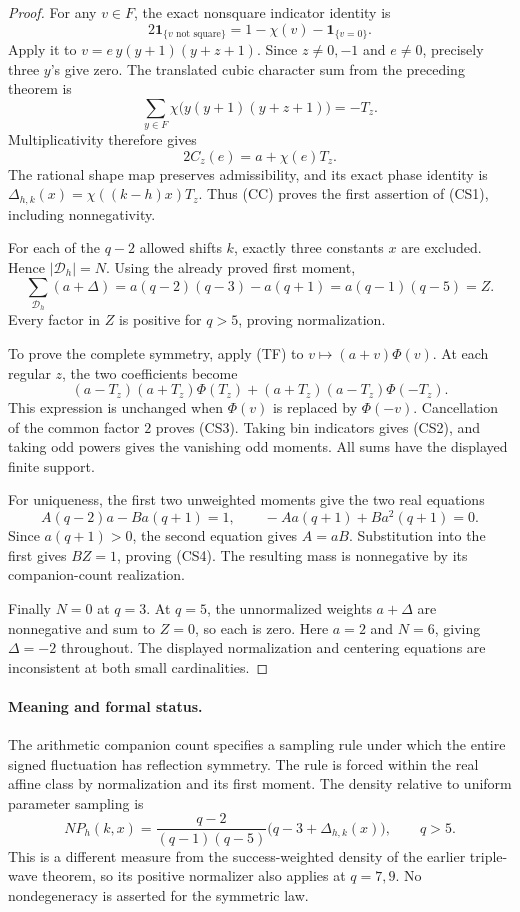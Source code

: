\documentclass[11pt]{article}
\begin{document}
\begin{proof}
For any \(v\in F\), the exact nonsquare indicator identity is
\[
 2\mathbf1_{\{v\text{ not square}\}}
 =1-\chi(v)-\mathbf1_{\{v=0\}}.
\]
Apply it to \(v=e\,y(y+1)(y+z+1)\). Since \(z\ne0,-1\)
and \(e\ne0\), precisely three \(y\)'s give zero. The translated
cubic character sum from the preceding theorem is
\[
 \sum_{y\in F}\chi\bigl(y(y+1)(y+z+1)\bigr)=-T_z.
\]
Multiplicativity therefore gives
\[
 2C_z(e)=a+\chi(e)T_z. \tag{CC}
\]
The rational shape map preserves admissibility, and its exact phase
identity is \(\Delta_{h,k}(x)=\chi((k-h)x)T_z\).
Thus (CC) proves the first assertion of (CS1), including nonnegativity.

For each of the \(q-2\) allowed shifts \(k\), exactly three constants
\(x\) are excluded. Hence \(|\mathcal D_h|=N\).
Using the already proved first moment,
\[
 \sum_{\mathcal D_h}(a+\Delta)
 =a(q-2)(q-3)-a(q+1)
 =a(q-1)(q-5)=Z.
\]
Every factor in \(Z\) is positive for \(q>5\), proving normalization.

To prove the complete symmetry, apply (TF) to
\(v\mapsto(a+v)\Phi(v)\). At each regular \(z\), the two
coefficients become
\[
 (a-T_z)(a+T_z)\Phi(T_z)
 +(a+T_z)(a-T_z)\Phi(-T_z).
\]
This expression is unchanged when \(\Phi(v)\) is replaced by
\(\Phi(-v)\). Cancellation of the common factor \(2\) proves (CS3).
Taking bin indicators gives (CS2), and taking odd powers gives the
vanishing odd moments. All sums have the displayed finite support.

For uniqueness, the first two unweighted moments give the two real
equations
\[
 A(q-2)a-Ba(q+1)=1,\qquad
 -Aa(q+1)+Ba^2(q+1)=0.
\]
Since \(a(q+1)>0\), the second equation gives \(A=aB\).
Substitution into the first gives \(BZ=1\), proving (CS4).
The resulting mass is nonnegative by its companion-count realization.

Finally \(N=0\) at \(q=3\). At \(q=5\), the unnormalized weights
\(a+\Delta\) are nonnegative and sum to \(Z=0\), so each is zero.
Here \(a=2\) and \(N=6\), giving \(\Delta=-2\) throughout.
The displayed normalization and centering equations are inconsistent
at both small cardinalities.
\end{proof}

\paragraph{Meaning and formal status.}
The arithmetic companion count specifies a sampling rule under which the
entire signed fluctuation has reflection symmetry. The rule is forced
within the real affine class by normalization and its first moment.
The density relative to uniform parameter sampling is
\[
 NP_h(k,x)=
 \frac{q-2}{(q-1)(q-5)}\bigl(q-3+\Delta_{h,k}(x)\bigr),
 \qquad q>5.
\]
This is a different measure from the success-weighted density of the
earlier triple-wave theorem, so its positive normalizer also applies
at \(q=7,9\). No nondegeneracy is asserted for the symmetric law.
\end{document}
